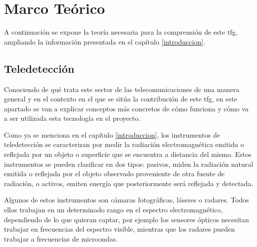 

\chapter{Marco Teórico}
\label{marcoteorico}
\par A continuación se expone la teoría necesaria para la comprensión de este \gls{tfg}, ampliando la información presentada en el capítulo \ref{introduccion}.

\section{Teledetección}
\par Conociendo de qué trata este sector de las telecomunicaciones de una manera general y en el contexto en el que se sitúa la contribución de este \gls{tfg}, en este apartado se van a explicar conceptos más concretos de cómo funciona y cómo va a ser utilizada esta tecnología en el proyecto. 
\\
\par Como ya se menciona en el capítulo \ref{introduccion}, los instrumentos de teledetección se caracterizan por medir la radiación electromagnética emitida o reflejada por un objeto o superficie que se encuentra a distancia del mismo. Estos instrumentos se pueden clasificar en dos tipos: pasivos, miden la radiación natural emitida o reflejada por el objeto observado proveniente de otra fuente de radiación, o activos, emiten energía que posteriormente será reflejada y detectada.
\\
\par Algunos de estos instrumentos son cámaras fotográficas, láseres o radares. Todos ellos trabajan en un determinado rango en el espectro electromagnético, dependiendo de lo que quieran captar, por ejemplo los sensores ópticos necesitan trabajar en frecuencias del espectro visible, mientras que los radares pueden trabajar a frecuencias de microondas.
